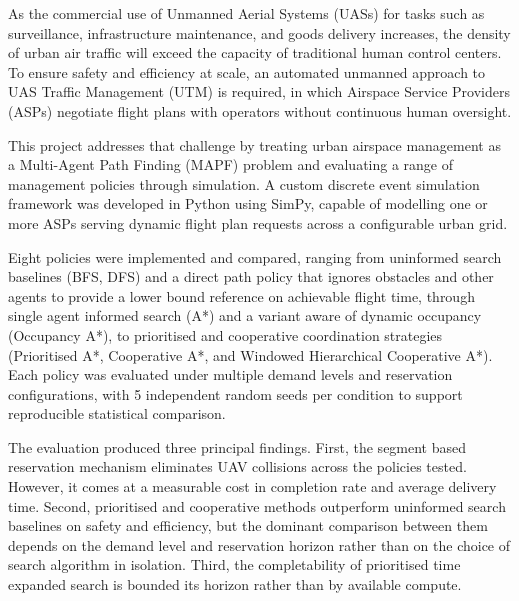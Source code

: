 As the commercial use of Unmanned Aerial Systems (UASs) for tasks such as surveillance, infrastructure maintenance, and goods delivery increases, the density of urban air traffic will exceed the capacity of traditional human control centers. To ensure safety and efficiency at scale, an automated unmanned approach to UAS Traffic Management (UTM) is required, in which Airspace Service Providers (ASPs) negotiate flight plans with operators without continuous human oversight.\par

\vspace{10pt}

This project addresses that challenge by treating urban airspace management as a Multi-Agent Path Finding (MAPF) problem and evaluating a range of management policies through simulation. A custom discrete event simulation framework was developed in Python using SimPy, capable of modelling one or more ASPs serving dynamic flight plan requests across a configurable urban grid.  \par

\vspace{10pt}

Eight policies were implemented and compared, ranging from uninformed search baselines (BFS, DFS) and a direct path policy that ignores obstacles and other agents to provide a lower bound reference on achievable flight time, through single agent informed search (A*) and a variant aware of dynamic occupancy (Occupancy A*), to prioritised and cooperative coordination strategies (Prioritised A*, Cooperative A*, and Windowed Hierarchical Cooperative A*). Each policy was evaluated under multiple demand levels and reservation configurations, with 5 independent random seeds per condition to support reproducible statistical comparison. \par

\vspace{10pt}

The evaluation produced three principal findings. First, the segment based reservation mechanism eliminates UAV collisions across the policies tested. However, it comes at a measurable cost in completion rate and average delivery time. Second, prioritised and cooperative methods outperform uninformed search baselines on safety and efficiency, but the dominant comparison between them depends on the demand level and reservation horizon rather than on the choice of search algorithm in isolation. Third, the completability of prioritised time expanded search is bounded its horizon rather than by available compute. \par


